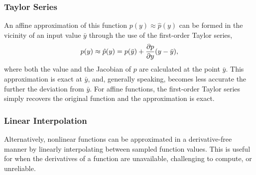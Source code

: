 \subsubsection{Taylor Series}
An affine approximation of this function ${p}(y) \approx \hat{p}(y)$ can be formed in the vicinity of an input value $\bar{y}$ through the use of the first-order Taylor series,
%
\begin{align}
    p(y) \approx \hat{p}(y) = p(\bar{y}) + \frac{\partial { p }}{ \partial { y }} (y - \bar{y}),
\end{align}
%
where both the value and the Jacobian of $p$ are calculated at the point $\bar{y}$. This approximation is exact at $\bar{y}$, and, generally speaking, becomes less accurate the further the deviation from $\bar{y}$. For affine functions, the first-order Taylor series simply recovers the original function and the approximation is exact.

%
\subsubsection{Linear Interpolation}
%
Alternatively, nonlinear functions can be approximated in a derivative-free manner by linearly interpolating between sampled function values. This is useful for when the derivatives of a function are unavailable, challenging to compute, or unreliable.
% 

